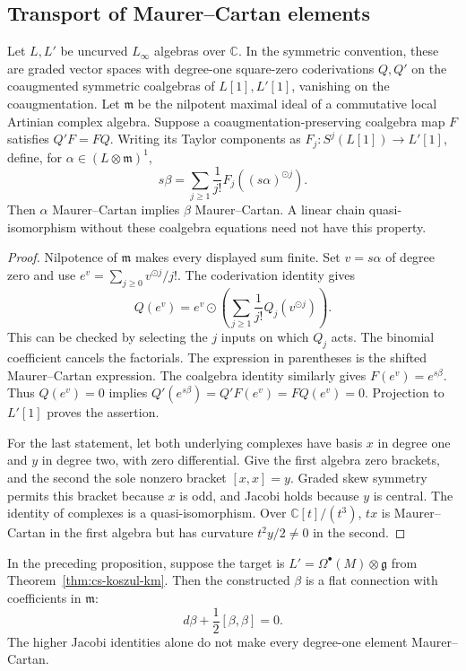 \subsection{Transport of Maurer--Cartan elements}

\begin{proposition}
\label{thm:linf-mc-flatness}
Let $L,L'$ be uncurved $L_\infty$ algebras over $\mathbb C$.
In the symmetric convention, these are graded vector spaces with degree-one square-zero coderivations $Q,Q'$ on the coaugmented symmetric coalgebras of $L[1],L'[1]$, vanishing on the coaugmentation.
Let $\mathfrak m$ be the nilpotent maximal ideal of a commutative local Artinian complex algebra.
Suppose a coaugmentation-preserving coalgebra map $F$ satisfies $Q'F=FQ$.
Writing its Taylor components as $F_j:S^j(L[1])\to L'[1]$, define, for $\alpha\in(L\otimes\mathfrak m)^1$,
\[
 s\beta=\sum_{j\geq1}\frac1{j!}F_j((s\alpha)^{\odot j}).
\]
Then $\alpha$ Maurer--Cartan implies $\beta$ Maurer--Cartan.
A linear chain quasi-isomorphism without these coalgebra equations need not have this property.
\end{proposition}

\begin{proof}
Nilpotence of $\mathfrak m$ makes every displayed sum finite.
Set $v=s\alpha$ of degree zero and use
$e^v=\sum_{j\geq0}v^{\odot j}/j!$.
The coderivation identity gives
\[
 Q(e^v)=e^v\odot\left(\sum_{j\geq1}\frac1{j!}Q_j(v^{\odot j})\right).
\]
This can be checked by selecting the $j$ inputs on which $Q_j$ acts.
The binomial coefficient cancels the factorials.
The expression in parentheses is the shifted Maurer--Cartan expression.
The coalgebra identity similarly gives $F(e^v)=e^{s\beta}$.
Thus $Q(e^v)=0$ implies
$Q'(e^{s\beta})=Q'F(e^v)=FQ(e^v)=0$.
Projection to $L'[1]$ proves the assertion.

For the last statement, let both underlying complexes have basis $x$ in degree one and $y$ in degree two, with zero differential.
Give the first algebra zero brackets, and the second the sole nonzero bracket $[x,x]=y$.
Graded skew symmetry permits this bracket because $x$ is odd, and Jacobi holds because $y$ is central.
The identity of complexes is a quasi-isomorphism.
Over $\mathbb C[t]/(t^3)$, $tx$ is Maurer--Cartan in the first algebra but has curvature $t^2y/2\ne0$ in the second.
\end{proof}

\begin{corollary}
\label{thm:cs-koszul-general}
In the preceding proposition, suppose the target is
$L'=\Omega^\bullet(M)\otimes\mathfrak g$ from Theorem~\ref{thm:cs-koszul-km}.
Then the constructed $\beta$ is a flat connection with coefficients in $\mathfrak m$:
\begin{equation}\label{eq:deformed-cs-general}
 d\beta+\frac12[\beta,\beta]=0.
\end{equation}
The higher Jacobi identities alone do not make every degree-one element Maurer--Cartan.
\end{corollary}

